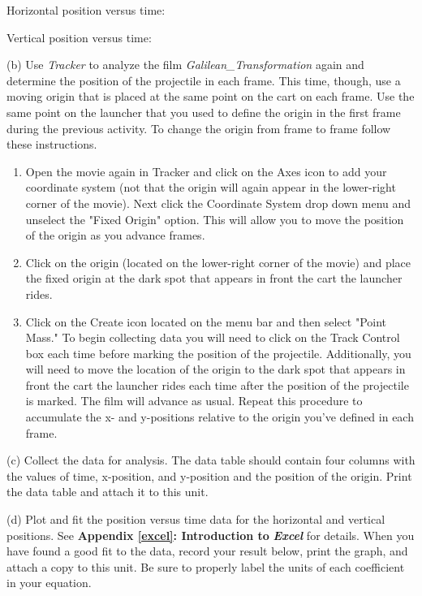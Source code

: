 Horizontal position versus time:
\vspace{10mm}

Vertical position versus time:
\vspace{10mm}

(b) Use \emph{Tracker} to analyze the film \emph{Galilean\_Transformation} again and determine the position of the projectile in each
frame. This time, though, use a moving origin that is placed
at the same point on the cart on each frame. Use the same point on
the launcher that you used to define the origin in the first frame
during the previous activity. To change the origin from frame to frame
follow these instructions.

\begin{enumerate}
\item Open the movie again in Tracker and click on the Axes icon to add your coordinate system (not that the origin will again appear in the lower-right corner of the movie).  Next click the Coordinate System drop down menu and unselect the "Fixed Origin" option. This will allow you to move the position of the origin as you advance frames.
\item Click on the origin (located on the lower-right corner of the movie) and place the fixed origin at the dark spot that appears in front the cart the launcher rides.
\item Click on the Create icon located on the menu bar and then select "Point Mass."  To begin collecting data you will need to click on the Track Control box each time before marking the position of the projectile.  Additionally, you will need to move the location of the origin to the dark spot that appears in front the cart the launcher rides each time after the position of the projectile is marked.  The film will advance as usual. Repeat this procedure to accumulate
the x- and y-positions relative to the origin you've defined in each
frame.
\end{enumerate}
(c) Collect the data for analysis. The data table should contain four
columns with the values of time, x-position, and y-position and the
position of the origin. Print the data table and attach it to this unit.

(d) Plot and fit the position versus time data for the horizontal
and vertical positions. See \textbf{Appendix \ref{excel}: Introduction to} \textbf{\emph{Excel}}
for details. When you have found a good fit to the data, record your
result below, print the graph, and attach a copy to this unit. Be
sure to properly label the units of each coefficient in your equation.

